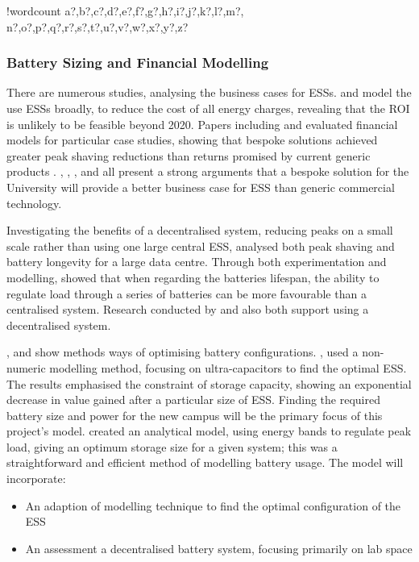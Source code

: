 \documentclass[fontsize=9.5pt]{extarticle}
\numberwithin{figure}{section} %
\providecommand{\tightlist}{%
  \setlength{\itemsep}{0pt}\setlength{\parskip}{0pt}}
\newcounter{words}
\newenvironment{counted}{%
  \setcounter{words}{0}
  \SearchList!{wordcount}{\stepcounter{words}}
    {a?,b?,c?,d?,e?,f?,g?,h?,i?,j?,k?,l?,m?,
    n?,o?,p?,q?,r?,s?,t?,u?,v?,w?,x?,y?,z?}
  \UndoBoundary{'}
  \SearchOrder{p;}}{%
  \StopSearching}
\begin{document}
\begin{counted}
\subsubsection{Battery Sizing and Financial
Modelling}\label{battery-sizing-and-financial-modelling}

There are numerous studies, analysing the business cases for ESSs.
\cite{7555795} and \cite{7555793} model the use ESSs broadly, to reduce
the cost of all energy charges, revealing that the ROI is unlikely to be
feasible beyond 2020. Papers including \cite{1300158} and \cite{6175723}
evaluated financial models for particular case studies, showing that
bespoke solutions achieved greater peak shaving reductions than returns
promised by current generic products \cite{abbpeakshave}.
\cite{7555795}, \cite{7555793}, \cite{1300158}, \cite{6175723} and
\cite{20164002874437} all present a strong arguments that a bespoke
solution for the University will provide a better business case for ESS
than generic commercial technology.

Investigating the benefits of a decentralised system, reducing peaks on
a small scale rather than using one large central ESS, \cite{6604477}
analysed both peak shaving and battery longevity for a large data
centre. Through both experimentation and modelling, \cite{6604477}
showed that when regarding the batteries lifespan, the ability to
regulate load through a series of batteries can be more favourable than
a centralised system. Research conducted by \cite{6348200} and
\cite{Demonstr51:online} also both support using a decentralised system.

\cite{20160601898032}, \cite{Levron201280} and \cite{5371839} show
methods ways of optimising battery configurations. \cite{5371839}, used
a non-numeric modelling method, focusing on ultra-capacitors to find the
optimal ESS. The results emphasised the constraint of storage capacity,
showing an exponential decrease in value gained after a particular size
of ESS. Finding the required battery size and power for the new campus
will be the primary focus of this project's model. \cite{Levron201280}
created an analytical model, using energy bands to regulate peak load,
giving an optimum storage size for a given system; this was a
straightforward and efficient method of modelling battery usage. The
model will incorporate:

\begin{itemize}
\tightlist
\item
  An adaption of \cite{20160601898032} modelling technique to find the
  optimal configuration of the ESS
\item
  An assessment a decentralised battery system, focusing primarily on
  lab space
\end{itemize}


\end{counted}
\end{document}
